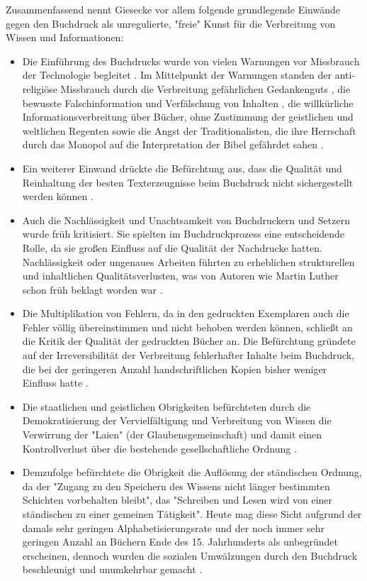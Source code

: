 Zusammenfassend nennt Giesecke vor allem folgende grundlegende Einwände gegen den Buchdruck als unregulierte, "freie" Kunst \cite{giesecke_1991_buchdruck} für die Verbreitung von Wissen und Informationen:
\begin{itemize}
\item Die Einführung des Buchdrucks wurde von vielen Warnungen vor Missbrauch der Technologie begleitet \cite{lange2008medienwettbewerb}. Im Mittelpunkt der Warnungen standen der anti-religiöse Missbrauch durch die Verbreitung gefährlichen Gedankenguts \cite{kruse2003multimedia}, die bewusste Falschinformation und Verfälschung von Inhalten \cite{sprachgeschichte_1998_besch}, die willkürliche Informationsverbreitung über Bücher, ohne Zustimmung der geistlichen und weltlichen Regenten \cite{rother_2002_siebenbuergen} sowie die Angst der Traditionalisten, die ihre Herrschaft durch das Monopol auf die Interpretation der Bibel gefährdet sahen \cite{lange2008medienwettbewerb}.
\item Ein weiterer Einwand drückte die Befürchtung aus, dass die Qualität und Reinhaltung der besten Texterzeugnisse beim Buchdruck nicht sichergestellt werden können \cite{giesecke_1991_buchdruck}.
\item Auch die Nachlässigkeit und Unachtsamkeit von Buchdruckern und Setzern wurde früh kritisiert. Sie spielten im Buchdruckprozess eine entscheidende Rolle, da sie großen Einfluss auf die Qualität der Nachdrucke hatten. Nachlässigkeit oder ungenaues Arbeiten führten zu erheblichen strukturellen und inhaltlichen Qualitätsverlusten, was von Autoren wie Martin Luther schon früh beklagt worden war \cite{sprachgeschichte_1998_besch} \cite{stober_2014_pressegeschichte} \cite{luther_1876}.
\item Die Multiplikation von Fehlern, da in den gedruckten Exemplaren auch die Fehler völlig übereinstimmen und nicht behoben werden können, schließt an die Kritik der Qualität der gedruckten Bücher an. Die Befürchtung gründete auf der Irreversibilität der Verbreitung fehlerhafter Inhalte beim Buchdruck, die bei der geringeren Anzahl handschriftlichen Kopien bisher weniger Einfluss hatte \cite{kittler_2004}.
\item Die staatlichen und geistlichen Obrigkeiten befürchteten durch die Demokratisierung der Vervielfältigung und Verbreitung von Wissen die Verwirrung der "Laien" (der Glaubensgemeinschaft) und damit einen Kontrollverlust über die bestehende gesellschaftliche Ordnung \cite{giesecke_1991_buchdruck}.
\item Demzufolge befürchtete die Obrigkeit die Auflösung der ständischen Ordnung, da der "Zugang zu den Speichern des Wissens nicht länger bestimmten Schichten vorbehalten bleibt", das "Schreiben und Lesen wird von einer ständischen zu einer gemeinen Tätigkeit". Heute mag diese Sicht aufgrund der damals sehr geringen Alphabetisierungsrate und der noch immer sehr geringen Anzahl an Büchern Ende des 15. Jahrhunderts als unbegründet erscheinen, dennoch wurden die sozialen Umwälzungen durch den Buchdruck beschleunigt und unumkehrbar gemacht \cite{giesecke_1991_buchdruck}.

\end{itemize}
